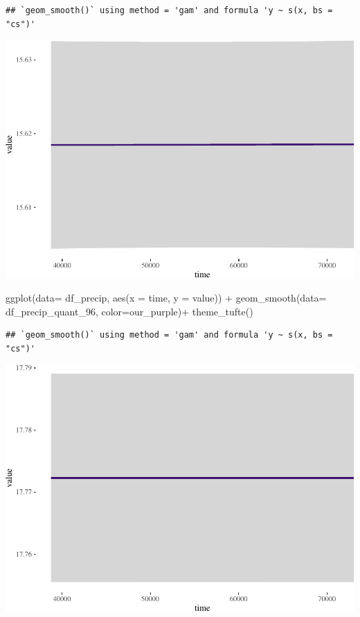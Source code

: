 \documentclass[
  paper=a4,
  ,captions=tableheading
]{scrartcl}
\newenvironment{Shaded}{\begin{snugshade}}{\end{snugshade}}
\newcommand{\AttributeTok}[1]{\textcolor[rgb]{0.77,0.63,0.00}{#1}}
\newcommand{\FunctionTok}[1]{\textcolor[rgb]{0.00,0.00,0.00}{#1}}
\newcommand{\NormalTok}[1]{#1}
\newcommand{\SpecialCharTok}[1]{\textcolor[rgb]{0.00,0.00,0.00}{#1}}
\begin{document}
\begin{verbatim}
## `geom_smooth()` using method = 'gam' and formula 'y ~ s(x, bs = "cs")'
\end{verbatim}

\includegraphics{Haskell_files/figure-latex/unnamed-chunk-49-2.pdf}

\begin{Shaded}
\begin{Highlighting}[]
\FunctionTok{ggplot}\NormalTok{(}\AttributeTok{data=}\NormalTok{ df\_precip, }\FunctionTok{aes}\NormalTok{(}\AttributeTok{x =}\NormalTok{ time, }\AttributeTok{y =}\NormalTok{ value)) }\SpecialCharTok{+} 
     \FunctionTok{geom\_smooth}\NormalTok{(}\AttributeTok{data=}\NormalTok{ df\_precip\_quant\_96, }\AttributeTok{color=}\NormalTok{our\_purple)}\SpecialCharTok{+}
  \FunctionTok{theme\_tufte}\NormalTok{()}
\end{Highlighting}
\end{Shaded}

\begin{verbatim}
## `geom_smooth()` using method = 'gam' and formula 'y ~ s(x, bs = "cs")'
\end{verbatim}

\includegraphics{Haskell_files/figure-latex/unnamed-chunk-49-3.pdf}
\end{document}

